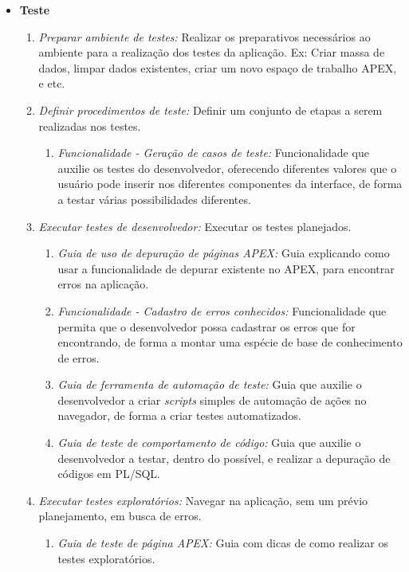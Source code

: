 \begin{itemize}
\begin{itemize}
\begin{enumerate}
\end{enumerate}
\end{itemize}
\item \textbf{Teste}
\begin{enumerate}
\item \textit{Preparar ambiente de testes:} Realizar os preparativos necessários ao ambiente para a realização dos testes da aplicação. Ex: Criar massa de dados, limpar dados existentes, criar um novo espaço de trabalho APEX, e etc.
\item \textit{Definir procedimentos de teste:} Definir um conjunto de etapas a serem realizadas nos testes.
\begin{enumerate}
\item \textit{Funcionalidade - Geração de casos de teste:} Funcionalidade que auxilie os testes do desenvolvedor, oferecendo diferentes valores que o usuário pode inserir nos diferentes componentes da interface, de forma a testar várias possibilidades diferentes.
\end{enumerate}
\item \textit{Executar testes de desenvolvedor:} Executar os testes planejados.
\begin{enumerate}
\item \textit{Guia de uso de depuração de páginas APEX:} Guia explicando como usar a funcionalidade de depurar existente no APEX, para encontrar erros na aplicação.
\item \textit{Funcionalidade - Cadastro de erros conhecidos:} Funcionalidade que permita que o desenvolvedor possa cadastrar os erros que for encontrando, de forma a montar uma espécie de base de conhecimento de erros.
\item \textit{Guia de ferramenta de automação de teste:} Guia que auxilie o desenvolvedor a criar \textit{scripts} simples de automação de ações no navegador, de forma a criar testes automatizados.
\item \textit{Guia de teste de comportamento de código:} Guia que auxilie o desenvolvedor a testar, dentro do possível, e realizar a depuração de códigos em PL/SQL.
\end{enumerate}
\item \textit{Executar testes exploratórios:} Navegar na aplicação, sem um prévio planejamento, em busca de erros.
\begin{enumerate}
\item \textit{Guia de teste de página APEX:} Guia com dicas de como realizar os testes exploratórios.
\end{enumerate}

\end{enumerate}
\end{itemize}
